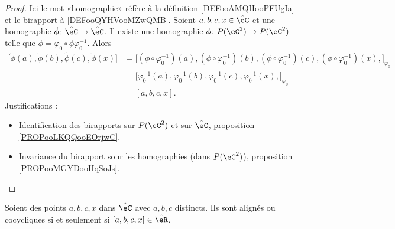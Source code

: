 \begin{proof}
    Ici le mot «homographie» réfère à la définition \ref{DEFooAMQHooPFUgIa} et le birapport à \ref{DEFooQYHVooMZwQMB}. Soient \( a,b,c,x\in\hat\eC\) et une homographie \( \tilde \phi\colon \hat \eC\to \hat \eC\). Il existe une homographie \( \phi\colon P(\eC^2)\to P(\eC^2)\) telle que \( \tilde \phi=\varphi_0\circ\phi\varphi_0^{-1}\). Alors
    \begin{subequations}
        \begin{align}
            \big[ \tilde \phi(a), \tilde \phi(b),\tilde \phi(c),\tilde \phi(x) \big]&=\big[  (\phi\circ\varphi_0^{-1})(a), (\phi\circ\varphi_0^{-1})(b),(\phi\circ\varphi_0^{-1})(c),  (\phi\circ\varphi_0^{-1})(x),  \big]_{\varphi_0}\\
            &=\big[  \varphi_0^{-1}(a), \varphi_0^{-1}(b),\varphi_0^{-1}(c), \varphi_0^{-1}(x),  \big]_{\varphi_0}\\
            &=[a,b,c,x].
        \end{align}
    \end{subequations}
    Justifications :
    \begin{itemize}
        \item Identification des birapports sur \( P(\eC^2)\) et sur \( \hat \eC\), proposition \ref{PROPooLKQQooEOrjwC}.
        \item Invariance du birapport sour les homographies (dans \( P(\eC^2)\)), proposition \ref{PROPooMGYDooHqSoJs}.
    \end{itemize}
\end{proof}

\begin{proposition}     \label{PROPooSGCJooLnOLCx}
    Soient des points \( a,b,c,x\) dans \( \hat\eC\) avec \( a,b,c\) distincts. Ils sont alignés ou cocycliques si et seulement si \( [a,b,c,x]\in \hat\eR\).
\end{proposition}

